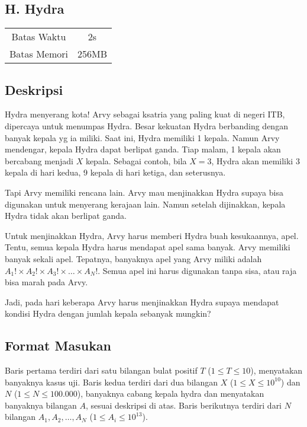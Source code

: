 \documentclass{article}
\begin{document}
\begin{center}
    \section*{H. Hydra} %

    \begin{tabular}{ | c c | }
        \hline
        Batas Waktu  & 2s \\    %
        Batas Memori & 256MB \\  %
        \hline
    \end{tabular}
\end{center}

\subsection*{Deskripsi}

Hydra menyerang kota! Arvy sebagai ksatria yang paling kuat di negeri ITB, dipercaya untuk menumpas Hydra.
Besar kekuatan Hydra berbanding dengan banyak kepala yg ia miliki.
Saat ini, Hydra memiliki 1 kepala. Namun Arvy mendengar, kepala Hydra dapat berlipat ganda.
Tiap malam, 1 kepala akan bercabang menjadi $X$ kepala.
Sebagai contoh, bila $X = 3$, Hydra akan memiliki 3 kepala di hari kedua, 9 kepala di hari ketiga, dan seterusnya.

Tapi Arvy memiliki rencana lain. Arvy mau menjinakkan Hydra supaya bisa digunakan untuk menyerang kerajaan lain.
Namun setelah dijinakkan, kepala Hydra tidak akan berlipat ganda.

Untuk menjinakkan Hydra, Arvy harus memberi Hydra buah kesukaannya, apel.
Tentu, semua kepala Hydra harus mendapat apel sama banyak.
Arvy memiliki banyak sekali apel.
Tepatnya, banyaknya apel yang Arvy miliki adalah $A_1! \times A_2! \times A_3! \times \dots \times A_N!$.
Semua apel ini harus digunakan tanpa sisa, atau raja bisa marah pada Arvy.

Jadi, pada hari keberapa Arvy harus menjinakkan Hydra supaya mendapat kondisi Hydra dengan jumlah kepala sebanyak mungkin?

\subsection*{Format Masukan}
Baris pertama terdiri dari satu bilangan bulat positif $T$ ($1 \leq T \leq 10$), menyatakan banyaknya kasus uji.
Baris kedua terdiri dari dua bilangan $X$ ($1 \leq X \leq {10}^{10}$) dan $N$ ($1 \leq N \leq 100.000$), banyaknya cabang kepala hydra dan menyatakan banyaknya bilangan $A$, sesuai deskripsi di atas.
Baris berikutnya terdiri dari $N$ bilangan $A_1, A_2, \dots, A_N$ ($1 \leq A_i \leq {10}^{13}$).
\end{document}
